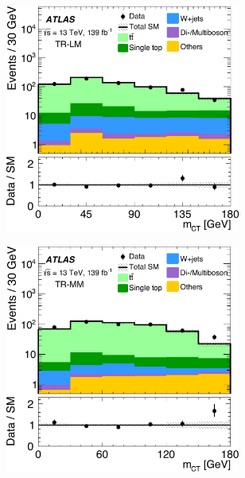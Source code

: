  \begin{figure}
	\centering
	\begin{subfigure}[b]{0.5\linewidth}
		\centering\includegraphics[width=0.85\textwidth]{fig_02a_yellow.pdf}
	\end{subfigure}\hfill
	\begin{subfigure}[b]{0.5\linewidth}
		\centering\includegraphics[width=0.85\textwidth]{fig_02b_yellow}
	\end{subfigure}\hfill
	\par\bigskip
	\begin{subfigure}[b]{0.5\linewidth}

\end{subfigure}
\end{figure}

